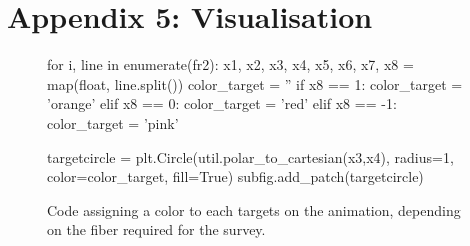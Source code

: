 \section{Appendix 5: Visualisation}

\begin{figure}[h]
\begin{center}
	\scriptsize{
	\begin{python}
    for i, line in enumerate(fr2):
        x1, x2, x3, x4, x5, x6, x7, x8 = map(float, line.split())
        color_target = ''
        if x8 == 1: color_target = 'orange'
        elif x8 == 0: color_target = 'red'
        elif x8 == -1: color_target = 'pink'

        targetcircle = plt.Circle(util.polar_to_cartesian(x3,x4), radius=1, color=color_target, fill=True)
        subfig.add_patch(targetcircle)
	\end{python}
	}
	\caption{Code assigning a color to each targets on the animation, depending on the fiber required for the survey.}
	\label{fig:appendix:visualisation}
\end{center}
\end{figure}